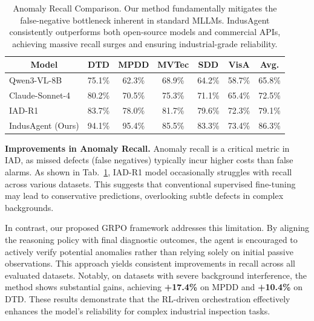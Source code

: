 \documentclass{llmxive}
\begin{document}
\begin{table}[t]
\centering
\setlength{\tabcolsep}{8pt} 
\small %
\begin{tabular}{l|ccccc|c}
\toprule
\multicolumn{1}{c|}{Model} & \multicolumn{1}{c}{DTD} & \multicolumn{1}{c}{MPDD} & \multicolumn{1}{c}{MVTec} & \multicolumn{1}{c}{SDD} & \multicolumn{1}{c|}{VisA} & \multicolumn{1}{c}{Avg.} \\
\midrule
Qwen3-VL-8B & 75.1\% & 62.3\% & 68.9\% & 64.2\% & 58.7\% & 65.8\% \\
Claude-Sonnet-4 & 80.2\% & 70.5\% & 75.3\% & 71.1\% & 65.4\% & 72.5\% \\
IAD-R1 &  \cellcolor{best}83.7\% &  \cellcolor{best}78.0\% &  \cellcolor{best}81.7\% &  \cellcolor{best}79.6\% &  \cellcolor{best}72.3\% &  \cellcolor{best}79.1\% \\
\midrule
IndusAgent (Ours) & \cellcolor{best2}94.1\% & \cellcolor{best2}95.4\% &\cellcolor{best2} 85.5\% & \cellcolor{best2}83.3\% & \cellcolor{best2}73.4\% & \cellcolor{best2}86.3\% \\
\bottomrule
\end{tabular}
\vspace{-1.0em}
\caption{Anomaly Recall Comparison. Our method fundamentally mitigates the false-negative bottleneck inherent in standard MLLMs. IndusAgent consistently outperforms both open-source models and commercial APIs, achieving massive recall surges and ensuring industrial-grade reliability.}
\label{tab:anomaly_recall}
\end{table}


\textbf{Improvements in Anomaly Recall.} 
Anomaly recall is a critical metric in IAD, as missed defects (false negatives) typically incur higher costs than false alarms. As shown in Tab.~\ref{tab:anomaly_recall}, IAD-R1 model occasionally struggles with recall across various datasets. This suggests that conventional supervised fine-tuning may lead to conservative predictions, overlooking subtle defects in complex backgrounds. 

In contrast, our proposed GRPO framework addresses this limitation. By aligning the reasoning policy with final diagnostic outcomes, the agent is encouraged to actively verify potential anomalies rather than relying solely on initial passive observations. This approach yields consistent improvements in recall across all evaluated datasets. Notably, on datasets with severe background interference, the method shows substantial gains, achieving \textbf{+17.4\%} on MPDD and \textbf{+10.4\%} on DTD. These results demonstrate that the RL-driven orchestration effectively enhances the model's reliability for complex industrial inspection tasks.
\end{document}
